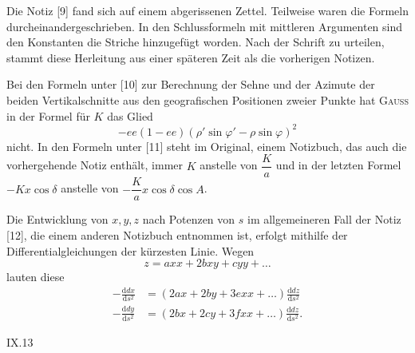 {Die Notiz [9] fand sich auf einem abgerissenen Zettel. Teilweise waren die Formeln durcheinandergeschrieben. In den Schlussformeln mit mittleren Argumenten sind den Konstanten die Striche hinzugefügt worden. Nach der Schrift zu urteilen, stammt diese Herleitung aus einer späteren Zeit als die vorherigen Notizen.

Bei den Formeln unter [10] zur Berechnung der Sehne und der Azimute der beiden Vertikalschnitte aus den geografischen Positionen zweier Punkte hat \textsc{Gauss} in der Formel für $K$ das Glied
\[
-ee(1-ee)(\rho'\sin\varphi'-\rho\sin\varphi)^2
\]
nicht. In den Formeln unter [11] steht im Original, einem Notizbuch, das auch die vorhergehende Notiz enthält, immer $K$ anstelle von $\dfrac Ka$ und in der letzten Formel $-Kx\cos\delta$ anstelle von $-\dfrac Ka x\cos\delta\cos A$.

Die Entwicklung von $x,y,z$ nach Potenzen von $s$ im allgemeineren Fall der Notiz [12], die einem anderen Notizbuch entnommen ist, erfolgt mithilfe der Differentialgleichungen der kürzesten Linie. Wegen
\[
z=axx+2bxy+cyy+\ldots
\]
lauten diese
\[
\begin{aligned}
-\frac{\mathrm ddx}{\mathrm ds^2}&=(2ax+2by+3exx+\ldots)\frac{\mathrm ddz}{\mathrm ds^2}\\
-\frac{\mathrm ddy}{\mathrm ds^2}&=(2bx+2cy+3fxx+\ldots)\frac{\mathrm ddz}{\mathrm ds^2}.
\end{aligned}
\]
\par}
\noindent IX.\hfill 13\par

